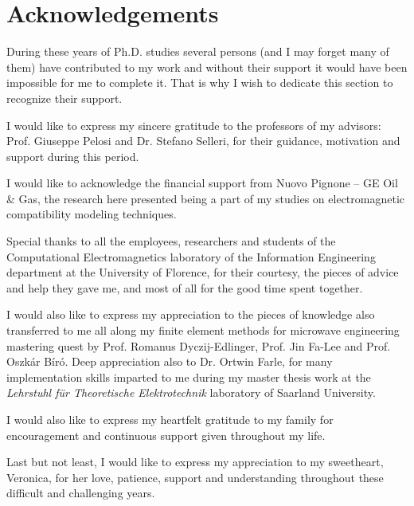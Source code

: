 \chapter*{Acknowledgements}

During these years of Ph.D. studies several persons (and I may forget many of them) have contributed to my work and without their support it would have been impossible for me to complete it. That is why I wish to dedicate this section to recognize their support.

I would like to express my sincere gratitude to the professors of my advisors: Prof. Giuseppe Pelosi and Dr. Stefano Selleri, for their guidance, motivation and support during this period.

I would like to acknowledge the financial support from Nuovo Pignone -- GE Oil \& Gas, the research here presented being a part of my studies on electromagnetic compatibility modeling techniques.

Special thanks to all the employees, researchers and students of the Computational Electromagnetics laboratory of the Information Engineering department at the University of Florence, for their courtesy, the pieces of advice and help they gave me, and most of all for the good time spent together.

I would also like to express my appreciation to the pieces of knowledge also transferred to me all along my finite element methods for microwave engineering mastering quest by Prof. Romanus Dyczij-Edlinger, Prof. Jin Fa-Lee and Prof. Oszk\'ar B\'ir\'o. Deep appreciation also to Dr. Ortwin Farle, for many implementation skills imparted to me during my master thesis work at the \textit{Lehrstuhl f\"ur Theoretische Elektrotechnik} laboratory of Saarland University.

I would also like to express my heartfelt gratitude to my family for encouragement
and continuous support given throughout my life.

Last but not least, I would like to express my appreciation to my sweetheart, Veronica, for her love, patience, support and understanding throughout these difficult and challenging years.
